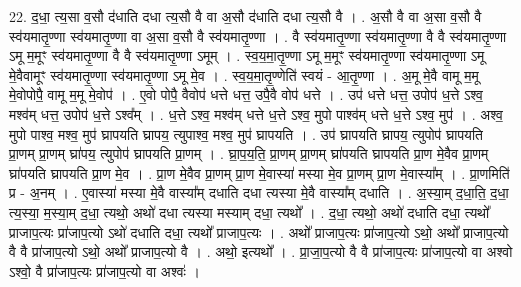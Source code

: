 \documentclass[17pt]{extarticle}
\begin{document}
22. द॒धा॒ त्य॒सा व॒सौ द॑धाति दधा त्य॒सौ वै वा अ॒सौ द॑धाति दधा त्य॒सौ वै । . अ॒सौ वै वा अ॒सा व॒सौ वै स्व॑यमातृ॒ण्णा स्व॑यमातृ॒ण्णा वा अ॒सा व॒सौ वै स्व॑यमातृ॒ण्णा । . वै स्व॑यमातृ॒ण्णा स्व॑यमातृ॒ण्णा वै वै स्व॑यमातृ॒ण्णा ऽमू म॒मूꣳ स्व॑यमातृ॒ण्णा वै वै स्व॑यमातृ॒ण्णा ऽमूम् । . स्व॒य॒मा॒तृ॒ण्णा ऽमू म॒मूꣳ स्व॑यमातृ॒ण्णा स्व॑यमातृ॒ण्णा ऽमू मे॒वैवामूꣳ स्व॑यमातृ॒ण्णा स्व॑यमातृ॒ण्णा ऽमू मे॒व । . स्व॒य॒मा॒तृ॒ण्णेति॑ स्वयं - आ॒तृ॒ण्णा । . अ॒मू मे॒वै वामू म॒मू मे॒वोपोपै॒ वामू म॒मू मे॒वोप॑ । . ए॒वो पोपै॒ वैवोप॑ धत्ते धत्त॒ उपै॒वै वोप॑ धत्ते । . उप॑ धत्ते धत्त॒ उपोप॑ ध॒त्ते ऽश्व॒ मश्व॑म् धत्त॒ उपोप॑ ध॒त्ते ऽश्व᳚म् । . ध॒त्ते ऽश्व॒ मश्व॑म् धत्ते ध॒त्ते ऽश्व॒ मुपो पाश्व॑म् धत्ते ध॒त्ते ऽश्व॒ मुप॑ । . अश्व॒ मुपो पाश्व॒ मश्व॒ मुप॑ घ्रापयति घ्रापय॒ त्युपाश्व॒ मश्व॒ मुप॑ घ्रापयति । . उप॑ घ्रापयति घ्रापय॒ त्युपोप॑ घ्रापयति प्रा॒णम् प्रा॒णम् घ्रा॑पय॒ त्युपोप॑ घ्रापयति प्रा॒णम् । . घ्रा॒प॒य॒ति॒ प्रा॒णम् प्रा॒णम् घ्रा॑पयति घ्रापयति प्रा॒ण मे॒वैव प्रा॒णम् घ्रा॑पयति घ्रापयति प्रा॒ण मे॒व । . प्रा॒ण मे॒वैव प्रा॒णम् प्रा॒ण मे॒वास्या॑ मस्या मे॒व प्रा॒णम् प्रा॒ण मे॒वास्या᳚म् । . प्रा॒णमिति॑ प्र - अ॒नम् । . ए॒वास्या॑ मस्या मे॒वै वास्या᳚म् दधाति दधा त्यस्या मे॒वै वास्या᳚म् दधाति । . अ॒स्या॒म् द॒धा॒ति॒ द॒धा॒ त्य॒स्या॒ म॒स्या॒म् द॒धा॒ त्यथो॒ अथो॑ दधा त्यस्या मस्याम् दधा॒ त्यथो᳚ । . द॒धा॒ त्यथो॒ अथो॑ दधाति दधा॒ त्यथो᳚ प्राजाप॒त्यः प्रा॑जाप॒त्यो ऽथो॑ दधाति दधा॒ त्यथो᳚ प्राजाप॒त्यः । . अथो᳚ प्राजाप॒त्यः प्रा॑जाप॒त्यो ऽथो॒ अथो᳚ प्राजाप॒त्यो वै वै प्रा॑जाप॒त्यो ऽथो॒ अथो᳚ प्राजाप॒त्यो वै । . अथो॒ इत्यथो᳚ । . प्रा॒जा॒प॒त्यो वै वै प्रा॑जाप॒त्यः प्रा॑जाप॒त्यो वा अश्वो ऽश्वो॒ वै प्रा॑जाप॒त्यः प्रा॑जाप॒त्यो वा अश्वः॑ । \newline
\end{document}
